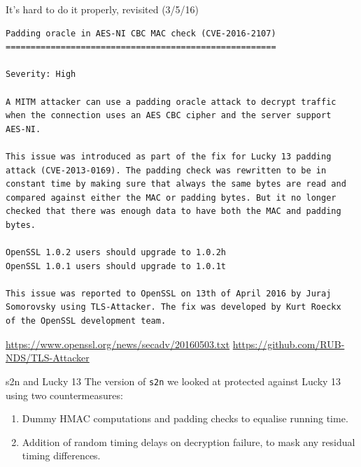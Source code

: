 \documentclass[presentation,smaller]{beamer}
\begin{document}
\begin{frame}[fragile,label={sec:orgheadline7}]{It’s hard to do it properly, revisited (3/5/16)}
 \begin{tiny}

\begin{verbatim}
Padding oracle in AES-NI CBC MAC check (CVE-2016-2107)
======================================================

Severity: High

A MITM attacker can use a padding oracle attack to decrypt traffic
when the connection uses an AES CBC cipher and the server support
AES-NI.

This issue was introduced as part of the fix for Lucky 13 padding
attack (CVE-2013-0169). The padding check was rewritten to be in
constant time by making sure that always the same bytes are read and
compared against either the MAC or padding bytes. But it no longer
checked that there was enough data to have both the MAC and padding
bytes.

OpenSSL 1.0.2 users should upgrade to 1.0.2h
OpenSSL 1.0.1 users should upgrade to 1.0.1t

This issue was reported to OpenSSL on 13th of April 2016 by Juraj
Somorovsky using TLS-Attacker. The fix was developed by Kurt Roeckx
of the OpenSSL development team.
\end{verbatim}

\end{tiny}


\url{https://www.openssl.org/news/secadv/20160503.txt}
\url{https://github.com/RUB-NDS/TLS-Attacker}
\end{frame}

\begin{frame}[fragile,label={sec:orgheadline8}]{s2n and Lucky 13}
 The version of \texttt{s2n} we looked at protected against Lucky 13 using two countermeasures:

\begin{enumerate}
\item Dummy HMAC computations and padding checks to equalise running time.

\item Addition of random timing delays on decryption failure, to mask any residual timing differences.
\end{enumerate}
\end{frame}
\end{document}
